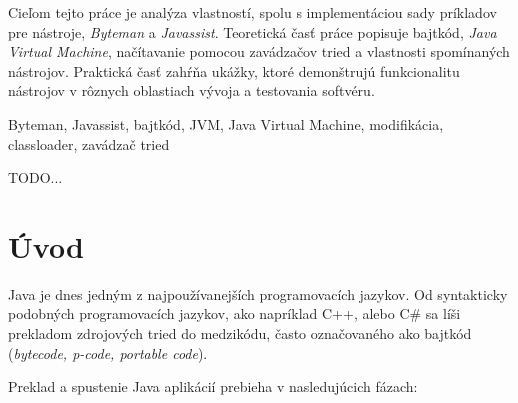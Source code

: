 \documentclass[11pt,final,oneside]{fithesis}
\begin{document}
\FrontMatter
\ThesisTitlePage

\begin{ThesisDeclaration}
\DeclarationText
\AdvisorName
\end{ThesisDeclaration}

\begin{ThesisAbstract}
Cieľom tejto práce je analýza vlastností, spolu s implementáciou sady 
príkladov pre nástroje, \textit{Byteman} a \textit{Javassist}. Teoretická časť 
práce popisuje bajtkód, \textit{Java Virtual Machine}, načítavanie pomocou 
zavádzačov tried a vlastnosti spomínaných nástrojov. Praktická časť zahŕňa  
ukážky, ktoré demonštrujú funkcionalitu nástrojov v rôznych oblastiach 
vývoja a testovania softvéru.
\end{ThesisAbstract}

\begin{ThesisKeyWords}
Byteman, Javassist, bajtkód, JVM, Java Virtual Machine, modifikácia, 
classloader, zavádzač tried
\end{ThesisKeyWords}

\begin{ThesisThanks}
TODO...
\end{ThesisThanks}

\MainMatter
\tableofcontents

\chapter{Úvod}

Java je dnes jedným z najpoužívanejších programovacích jazykov.
Od syntakticky podobných programovacích jazykov, ako napríklad C++, alebo
C\# sa líši prekladom zdrojových tried do medzikódu, často označovaného ako
bajtkód (\textit{bytecode, p-code, portable code}).

Preklad a spustenie Java aplikácií prebieha v nasledujúcich fázach:
\end{document}
